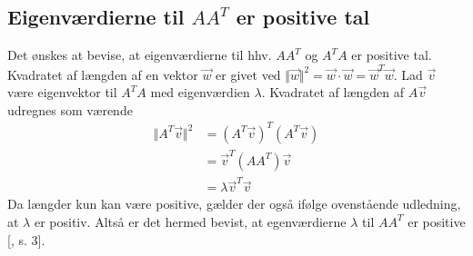 %
%
%

\subsection*{Eigenværdierne til $AA^T$ er positive tal} \label{subsec:pos_eigenvalue}
Det ønskes at bevise, at eigenværdierne til hhv. $AA^T$ og $A^TA$ er positive tal. Kvadratet af længden  af en vektor $\vec{w}$ er givet ved $\Vert \vec{w} \Vert^2= \vec{w} \cdot \vec{w} = \vec{w}^T\vec{w}$. Lad $\vec{v}$ være eigenvektor til $A^TA$ med eigenværdien $\lambda$. Kvadratet af længden af $A\vec{v}$ udregnes som værende
\begin{align}
\Vert A^T\vec{v} \Vert^2 & = (A^T\vec{v})^T (A^T\vec{v}) \\
	& = \vec{v}^T(AA^T ) \vec{v} \\	
	& = \lambda \vec{v}^T \vec{v}
\end{align}
Da længder kun kan være positive, gælder der også ifølge ovenstående udledning, at $\lambda$ er positiv. Altså er det hermed bevist, at egenværdierne $\lambda$ til $AA^T$ er positive [\citet{PCA_jeff}, s. 3].